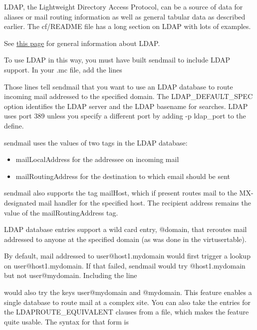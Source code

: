 \protect\hypertarget{part0026_split_034.htmlux5cux23_idIndexMarker2529}{}{}LDAP,
the Lightweight Directory Access Protocol, can be a source of data for
aliases or mail routing information as well as general tabular data as
described earlier. The {cf/README} file has a long section on LDAP with
lots of examples.

\leavevmode\hypertarget{part0026_split_034.htmlux5cux23_idContainer1142}{}%
See
\protect\hyperlink{part0025_split_002.htmlux5cux23_idTextAnchor974}{this
page} for general information about LDAP.

To use LDAP in this way, you must have built {sendmail} to include LDAP
support. In your {.mc} file, add the lines


Those lines tell {sendmail} that you want to use an LDAP database to
route incoming mail addressed to the specified domain. The
{LDAP\_DEFAULT\_SPEC} option identifies the LDAP server and the LDAP
basename for searches. LDAP uses port 389 unless you specify a different
port by adding {-p} {ldap\_port} to the {define}.

{sendmail} uses the values of two tags in the LDAP database:

\begin{itemize}
\tightlist
\item
  {mailLocalAddress} for the addressee on incoming mail
\item
  {mailRoutingAddress} for the destination to which email should be sent
\end{itemize}

{sendmail} also supports the tag {mailHost}, which if present routes
mail to the MX-designated mail handler for the specified host. The
recipient address remains the value of the {mailRoutingAddress} tag.

LDAP database entries support a wild card entry, {@domain}, that
reroutes mail addressed to anyone at the specified domain (as was done
in the {virtusertable}).

By default, mail addressed to user@host1.mydomain would first trigger a
lookup on user@host1.mydomain. If that failed, {sendmail} would try
@host1.mydomain but not user@mydomain. Including the line


would also try the keys user@mydomain and @mydomain. This feature
enables a single database to route mail at a complex site. You can also
take the entries for the {LDAPROUTE\_EQUIVALENT} clauses from a file,
which makes the feature quite usable. The syntax for that form is

